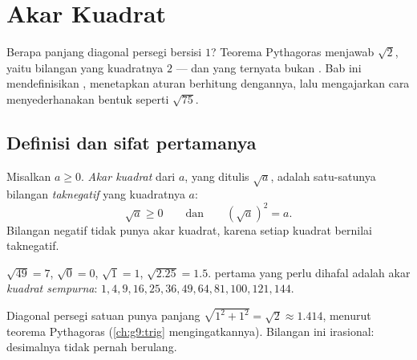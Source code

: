 \chapter{Akar Kuadrat}\label{ch:g9:sqrt}

Berapa panjang diagonal persegi bersisi $1$? Teorema Pythagoras
menjawab $\sqrt 2$, yaitu bilangan yang kuadratnya $2$ --- dan yang
ternyata bukan . Bab ini mendefinisikan ,
menetapkan aturan berhitung dengannya, lalu mengajarkan cara
menyederhanakan bentuk seperti $\sqrt{75}$.

\section{Definisi dan sifat pertamanya}

\begin{definition}\label{def:g9:sqrt:def}
Misalkan $a \geq 0$. \emph{Akar kuadrat} dari $a$,
yang ditulis $\sqrt a$, adalah satu-satunya bilangan
\emph{taknegatif} yang kuadratnya $a$:
\[
\sqrt a \geq 0
\qquad\text{dan}\qquad
\left(\sqrt a\right)^2 = a .
\]
Bilangan negatif tidak punya akar kuadrat, karena setiap kuadrat bernilai taknegatif.
\end{definition}

\begin{example}
$\sqrt{49} = 7$, $\sqrt 0 = 0$, $\sqrt 1 = 1$,
$\sqrt{2.25} = 1.5$.  pertama yang perlu dihafal adalah
akar \emph{kuadrat sempurna}: $1, 4, 9, 16, 25, 36, 49, 64, 81, 100,
121, 144$.
\end{example}

\begin{omfigure}

{\small Diagonal persegi satuan punya panjang $\sqrt{1^2 + 1^2} =
\sqrt2 \approx 1.414$, menurut teorema Pythagoras
(\cref{ch:g9:trig} mengingatkannya). Bilangan ini irasional:
desimalnya tidak pernah berulang.}
\end{omfigure}

